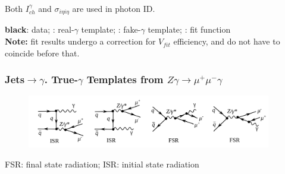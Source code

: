 \begin{frame}
\begin{center}
\tiny
Both $I_{ch}^{\gamma}$ and $\sigma_{i\eta i\eta}$ are used in photon ID.\\
\end{center}
{\bfseries{black}}: data; {\bfseries\color{green}{green}}: real-$\gamma$ template; {\bfseries\color{blue}{blue}}: fake-$\gamma$ template; {\bfseries\color{red}{red}}: fit function\\
{\bfseries{Note:}} fit results undergo a correction for $V_{fit}$ efficiency, and do not have to coincide before that. 
\end{frame}

\begin{frame}\frametitle{Jets$\rightarrow \gamma$. True-$\gamma$ Templates from $Z\gamma\rightarrow \mu^+ \mu^- \gamma $}

  \begin{figure}[htb]
      \begin{center}
        \scriptsize
          \includegraphics[width=0.95\textwidth]{../figs/ForPresentation/feynmZg_LO.png}
       \end{center}
    \end{figure}

\tiny
FSR: final state radiation; ISR: initial state radiation


\end{frame}
